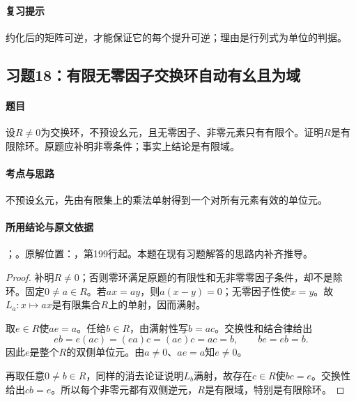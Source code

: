 \paragraph{复习提示}

约化后的矩阵可逆，才能保证它的每个提升可逆；理由是行列式为单位的判据。



\subsection{习题18：有限无零因子交换环自动有幺且为域}

\label{ex:3:18}

\paragraph{题目}

设$R\ne0$为交换环，不预设幺元，且无零因子、非零元素只有有限个。证明$R$是有限除环。原题应补明非零条件；事实上结论是有限域。

\paragraph{考点与思路}

不预设幺元，先由有限集上的乘法单射得到一个对所有元素有效的单位元。

\paragraph{所用结论与原文依据}

；。原解位置：，第199行起。本题在现有习题解答的思路内补齐推导。


\begin{proof}

补明$R\ne0$；否则零环满足原题的有限性和无非零零因子条件，却不是除环。固定$0\ne a\in R$。若$ax=ay$，则$a(x-y)=0$；无零因子性使$x=y$。故$L_a:x\mapsto ax$是有限集合$R$上的单射，因而满射。

取$e\in R$使$ae=a$。任给$b\in R$，由满射性写$b=ac$。交换性和结合律给出
\[
eb=e(ac)=(ea)c=(ae)c=ac=b,\qquad be=eb=b.
\]
因此$e$是整个$R$的双侧单位元。由$a\ne0$、$ae=a$知$e\ne0$。

再取任意$0\ne b\in R$，同样的消去论证说明$L_b$满射，故存在$c\in R$使$bc=e$。交换性给出$cb=e$。所以每个非零元都有双侧逆元，$R$是有限域，特别是有限除环。

\end{proof}

